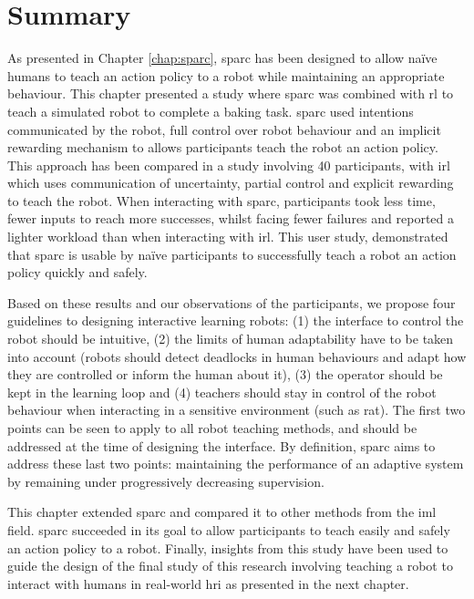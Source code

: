 \section{Summary}

As presented in Chapter \ref{chap:sparc}, \gls{sparc} has been designed to allow na\"ive humans to teach an action policy to a robot while maintaining an appropriate behaviour. This chapter presented a study where \gls{sparc} was combined with \gls{rl} to teach a simulated robot to complete a baking task. \gls{sparc} used intentions communicated by the robot, full control over robot behaviour and an implicit rewarding mechanism to allows participants teach the robot an action policy. This approach has been compared in a study involving 40 participants, with \gls{irl} which uses communication of uncertainty, partial control and explicit rewarding to teach the robot. When interacting with \gls{sparc}, participants took less time, fewer inputs to reach more successes, whilst facing fewer failures and reported a lighter workload than when interacting with \gls{irl}. This user study, demonstrated that \gls{sparc} is usable by na\"ive participants to successfully teach a robot an action policy quickly and safely.

Based on these results and our observations of the participants, we propose four guidelines to designing interactive learning robots: (1) the interface to control the robot should be intuitive, (2) the limits of human adaptability have to be taken into account (robots should detect deadlocks in human behaviours and adapt how they are controlled or inform the human about it), (3) the operator should be kept in the learning loop and (4) teachers should stay in control of the robot behaviour when interacting in a sensitive environment (such as \gls{rat}). The first two points can be seen to apply to all robot teaching methods, and should be addressed at the time of designing the interface. By definition, \gls{sparc} aims to address these last two points: maintaining the performance of an adaptive system by remaining under progressively decreasing supervision.

This chapter extended \gls{sparc} and compared it to other methods from the \gls{iml} field. \gls{sparc} succeeded in its goal to allow participants to teach easily and safely an action policy to a robot. Finally, insights from this study have been used to guide the design of the final study of this research involving teaching a robot to interact with humans in real-world \gls{hri} as presented in the next chapter.


